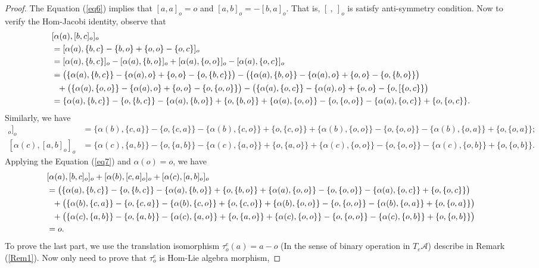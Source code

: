 \documentclass[14pt]{article}
\theoremstyle{Definition}
\theoremstyle{remark}
\begin{document}
\begin{proof}
The Equation (\ref{eq6}) implies that $[a,a]_{o}=o$ and $[a,b]_{o}=-[b,a]_{o}$.  That is, $[~,~]_{o}$ is satisfy anti-symmetry condition.
Now to verify the Hom-Jacobi identity, observe that
\begin{align*}
&[\alpha(a),[b,c]_{o}]_{o}\\
&=[\alpha(a),\{b,c\}-\{b,o\}+\{o,o\}-\{o,c\}]_{o}\\
&=[\alpha(a),\{b,c\}]_{o}-[\alpha(a),\{b,o\}]_{o}+[\alpha(a),\{o,o\}]_{o}-[\alpha(a),\{o,c\}]_{o}\\
&=\big{(}\{\alpha(a),\{b,c\}\}-\{\alpha(a),o\}+\{o,o\}-\{o,\{b,c\}\}\big{)}-\big{(}\{\alpha(a),\{b,o\}\}-\{\alpha(a),o\}+\{o,o\}-\{o,\{b,o\}\}\big{)}\\
&~~+\big{(}\{\alpha(a),\{o,o\}\}-\{\alpha(a),o\}+\{o,o\}-\{o,\{o,o\}\}\big{)}-\big{(}\{\alpha(a),\{o,c\}\}-\{\alpha(a),o\}+\{o,o\}-\{o,[\{o,c\}\}\big{)}\\
&=\{\alpha(a),\{b,c\}\}-\{o,\{b,c\}\}-\{\alpha(a),\{b,o\}\}+\{o,\{b,o\}\}+\{\alpha(a),\{o,o\}\}-\{o,\{o,o\}\}-\{\alpha(a),\{o,c\}\}+\{o,\{o,c\}\}.
\end{align*}
Similarly, we have
\begin{align*}
[\alpha(b),[c,a]_{o}]_{o}&=\{\alpha(b),\{c,a\}\}-\{o,\{c,a\}\}-\{\alpha(b),\{c,o\}\}+\{o,\{c,o\}\}+\{\alpha(b),\{o,o\}\}-\{o,\{o,o\}\}-\{\alpha(b),\{o,a\}\}+\{o,\{o,a\}\};\\
[\alpha(c),[a,b]_{o}]_{o}&=\{\alpha(c),\{a,b\}\}-\{o,\{a,b\}\}-\{\alpha(c),\{a,o\}\}+\{o,\{a,o\}\}+\{\alpha(c),\{o,o\}\}-\{o,\{o,o\}\}-\{\alpha(c),\{o,b\}\}+\{o,\{o,b\}\}.
\end{align*}
Applying the Equation (\ref{eq7}) and $\alpha(o)=o$, we have
\begin{align*}
&[\alpha(a),[b,c]_{o}]_{o}+[\alpha(b),[c,a]_{o}]_{o}+[\alpha(c),[a,b]_{o}]_{o}\\
&=\big{(}\{\alpha(a),\{b,c\}\}-\{o,\{b,c\}\}-\{\alpha(a),\{b,o\}\}+\{o,\{b,o\}\}+\{\alpha(a),\{o,o\}\}-\{o,\{o,o\}\}-\{\alpha(a),\{o,c\}\}+\{o,\{o,c\}\}\big{)}\\
&~~+\big{(}\{\alpha(b),\{c,a\}\}-\{o,\{c,a\}\}-\{\alpha(b),\{c,o\}\}+\{o,\{c,o\}\}+\{\alpha(b),\{o,o\}\}-\{o,\{o,o\}\}-\{\alpha(b),\{o,a\}\}+\{o,\{o,a\}\}\big{)}\\
&~~+\big{(}\{\alpha(c),\{a,b\}\}-\{o,\{a,b\}\}-\{\alpha(c),\{a,o\}\}+\{o,\{a,o\}\}+\{\alpha(c),\{o,o\}\}-\{o,\{o,o\}\}-\{\alpha(c),\{o,b\}\}+\{o,\{o,b\}\}\big{)}\\
&=o.
\end{align*}
To prove the last part, we use the translation isomorphism $\tau_{o}^{e}(a)=a-o$ (In the sense of binary operation in $T_{e}\mathcal{A}$) describe in Remark (\ref{Rem1}). Now only need to prove that $\tau_{o}^{e}$ is Hom-Lie algebra morphism,

\end{proof}
\end{document}
